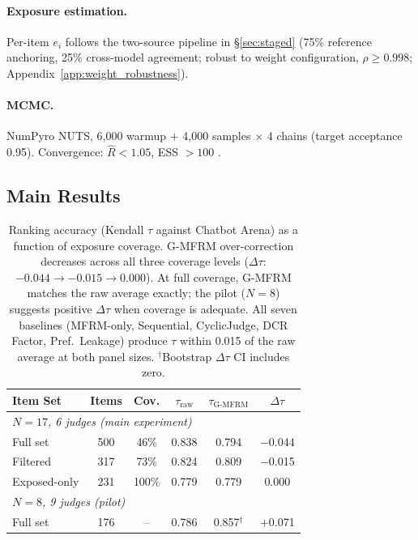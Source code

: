 \paragraph{Exposure estimation.} Per-item $e_i$ follows the two-source pipeline in \S\ref{sec:staged} (75\% reference anchoring, 25\% cross-model agreement; robust to weight configuration, $\rho \geq 0.998$; Appendix~\ref{app:weight_robustness}).

\paragraph{MCMC.} NumPyro \citep{phan2019numpyro} NUTS, 6{,}000 warmup $+$ 4{,}000 samples $\times$ 4 chains (target acceptance 0.95). Convergence: $\hat{R} < 1.05$, ESS $> 100$ \citep{vehtari2021rhat, gelman2013bda}.

\subsection{Main Results}
\label{sec:main_results}

\begin{table}[t]
\centering
\footnotesize
\setlength{\tabcolsep}{3.5pt}
\begin{tabular}{lccccc}
\toprule
\textbf{Item Set} & \textbf{Items} & \textbf{Cov.} & $\tau_{\mathrm{raw}}$ & $\tau_{\mathrm{G\text{-}MFRM}}$ & $\Delta\tau$ \\
\midrule
\multicolumn{6}{l}{\textit{$N = 17$, 6 judges (main experiment)}} \\
Full set & 500 & 46\% & 0.838 & 0.794 & $-$0.044 \\
Filtered & 317 & 73\% & 0.824 & 0.809 & $-$0.015 \\
Exposed-only & 231 & 100\% & 0.779 & 0.779 & \phantom{$-$}0.000 \\
\midrule
\multicolumn{6}{l}{\textit{$N = 8$, 9 judges (pilot)}} \\
Full set & 176 & -- & 0.786 & 0.857$^{\dagger}$ & $+$0.071 \\
\bottomrule
\end{tabular}
\caption{Ranking accuracy (Kendall $\tau$ against Chatbot Arena) as a function of exposure coverage. G-MFRM over-correction decreases across all three coverage levels ($\Delta\tau$: $-0.044 \to -0.015 \to 0.000$). At full coverage, G-MFRM matches the raw average exactly; the pilot ($N = 8$) suggests positive $\Delta\tau$ when coverage is adequate. All seven baselines (MFRM-only, Sequential, CyclicJudge, DCR Factor, Pref.\ Leakage) produce $\tau$ within 0.015 of the raw average at both panel sizes. $^{\dagger}$Bootstrap $\Delta\tau$ CI includes zero.}
\label{tab:main_results}
\end{table}

